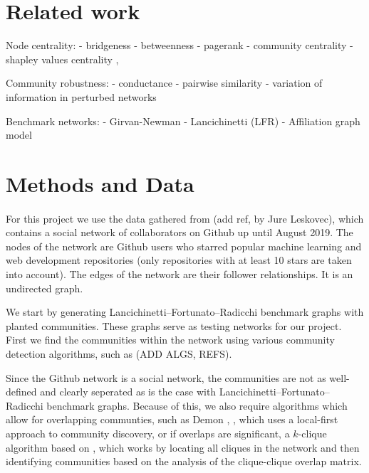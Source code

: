 \documentclass[9pt,twocolumn,twoside]{pnas-new}
\begin{document}
\section*{Related work}

Node centrality:
- bridgeness \cite{Jensen_2015}
- betweenness \cite{freeman}
- pagerank \cite{pagerank}
- community centrality \cite{Newman_2006}
- shapley values centrality \cite{michalak}, \cite{narahari}

Community robustness:
- conductance \cite{kannan-vempala}
- pairwise similarity \cite{bommarito-katz}
- variation of information in perturbed networks \cite{karrer-levina}

Benchmark networks:
- Girvan-Newman \cite{girvan-newman}
- Lancichinetti (LFR) \cite{lfr}
- Affiliation graph model \cite{yang-leskovec}

\section*{Methods and Data}

\paragraph{}For this project we use the data gathered from (add ref, by Jure Leskovec), 
which contains a social network of collaborators on Github up until August 2019. 
The nodes of the network are Github users who starred popular machine learning and web development repositories 
(only repositories with at least 10 stars are taken into account).
The edges of the network are their follower relationships. It is an undirected graph.

We start by generating Lancichinetti–Fortunato–Radicchi benchmark graphs with planted communities.
These graphs serve as testing networks for our project.
First we find the communities within the network using various community detection algorithms, such as (ADD ALGS, REFS). 

Since the Github network is a social network, the communities are not as well-defined and clearly seperated as is the case with Lancichinetti–Fortunato–Radicchi benchmark graphs.
Because of this, we also require algorithms which allow for overlapping communties, 
such as Demon \cite{Demon}, \cite{coscia-rossetti}, which uses a local-first approach to community discovery, or if overlaps are significant,
a $k$-clique algorithm based on \cite{palla-derenyi}, which works by locating all cliques in the network and then identifying communities based on the analysis of the clique-clique overlap matrix.
\end{document}
